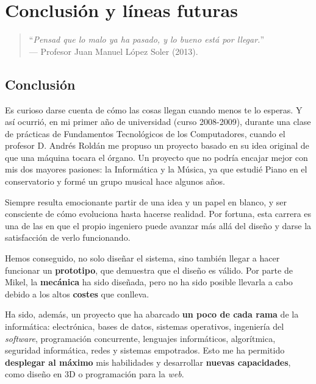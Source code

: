 \chapter{Conclusión y líneas futuras}
\label{cap:capitulo7}

\begin{quote}
	\begin{flushright}
		\small ``\textit{Pensad que lo malo ya ha pasado, y lo bueno está por llegar.}'' \\
		--- Profesor Juan Manuel López Soler (2013).
	\end{flushright}
\end{quote}

\newpage

\section{Conclusión}

Es curioso darse cuenta de cómo las cosas llegan cuando menos te lo esperas. Y así ocurrió, en mi primer año de universidad (curso 2008-2009), durante una clase de prácticas de Fundamentos Tecnológicos de los Computadores, cuando el profesor D. Andrés Roldán me propuso un proyecto basado en su idea original de que una máquina tocara el órgano. Un proyecto que no podría encajar mejor con mis dos mayores pasiones: la Informática y la Música, ya que estudié Piano en el conservatorio y formé un grupo musical hace algunos años.

Siempre resulta emocionante partir de una idea y un papel en blanco, y ser consciente de cómo evoluciona hasta hacerse realidad. Por fortuna, esta carrera es una de las en que el propio ingeniero puede avanzar más allá del diseño y darse la satisfacción de verlo funcionando.

Hemos conseguido, no solo diseñar el sistema, sino también llegar a hacer funcionar un \textbf{prototipo}, que demuestra que el diseño es válido. Por parte de Mikel, la \textbf{mecánica} ha sido diseñada, pero no ha sido posible llevarla a cabo debido a los altos \textbf{costes} que conlleva.

Ha sido, además, un proyecto que ha abarcado \textbf{un poco de cada rama} de la informática: electrónica, bases de datos, sistemas operativos, ingeniería del \textit{software}, programación concurrente, lenguajes informáticos, algorítmica, seguridad informática, redes y sistemas empotrados. Esto me ha permitido \textbf{desplegar al máximo} mis habilidades y desarrollar \textbf{nuevas capacidades}, como diseño en 3D o programación para la \textit{web}.

